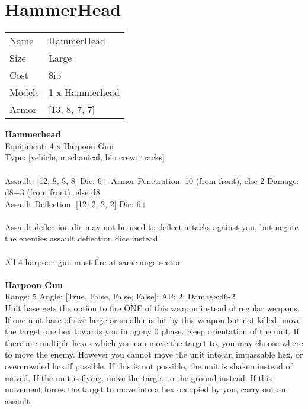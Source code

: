 \pagebreak\pagebreak

\section{ HammerHead }

\begin{tabular}{ll}
  Name & HammerHead \\
  Size & Large\\
  Cost & 8ip\\
  Models & 1 x Hammerhead\\
  Armor & [13, 8, 7, 7]\\
\end{tabular}

\noindent 

{\bf Hammerhead } \\
Equipment: 4 x Harpoon Gun \\
Type: [vehicle, mechanical, bio crew, tracks] \\
\ \\
Assault: [12, 8, 8, 8] Die: 6+ Armor Penetration: 10 (from front), else 2 Damage: d8+3 (from front), else d8 \\
Assault Deflection: [12, 2, 2, 2] Die: 6+\\
\\ 
Assault deflection die may not be used to deflect attacks against you, but negate the enemies assault deflection dice instead\\ 
 
\ \\
All 4 harpoon gun must fire at same ange-sector\\ 

\ \\
{\bf Harpoon Gun } \\



Range: 5  Angle: [True, False, False, False]: AP: 2: Damage:d6-2 \\
Unit base gets the option to fire ONE of this weapon instead of regular weapons.\\ 
If one unit-base of size large or smaller is hit by this weapon but not killed, move the target one hex towards you in agony 0 phase. Keep orientation of the unit. If there are multiple hexes which you can move the target to, you may choose where to move the enemy. However you cannot move the unit into an impassable hex, or overcrowded hex if possible. If this is not possible, the unit is shaken instead of moved. If the unit is flying, move the target to the ground instead. If this movement forces the target to move into a hex occupied by you, carry out an assault.\\ 




